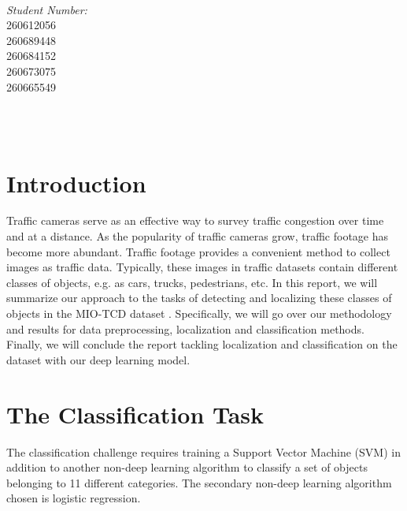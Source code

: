 \documentclass[12pt]{article}
\makeatletter
\let\thedate\@date
\makeatother
\begin{document}
\begin{titlepage}
\begin{minipage}{0.4\textwidth}
\begin{flushleft}
            \end{flushleft}
            \end{minipage}~
            \begin{minipage}{0.4\textwidth}
            \begin{flushright} \large
            \emph{Student Number:} \\
            260612056 \\ 
            260689448 \\ 
            260684152 \\ 
            260673075 \\ 
            260665549  %
        \end{flushright}
    \end{minipage}\\[2 cm]
 
    {\large \thedate}\\[2 cm]
 
    \vfill
    
\end{titlepage}


\section{Introduction}
 Traffic cameras serve as an effective way to survey traffic congestion over time and at a distance. As the popularity of traffic cameras grow, traffic footage has become more abundant. Traffic footage provides a convenient method to collect images as traffic data. Typically, these images in traffic datasets contain different classes of objects, e.g. as cars, trucks, pedestrians, etc. In this report, we will summarize our approach to the tasks of detecting and localizing these classes of objects in the MIO-TCD dataset \cite{MIO_TCD}. Specifically, we will go over our methodology and results for data preprocessing, localization and classification methods. Finally, we will conclude the report tackling localization and classification on the dataset with our deep learning model. 

\section{The Classification Task}

The classification challenge requires training a Support Vector Machine (SVM) in addition to another non-deep learning algorithm to classify a set of objects belonging to 11 different categories. The secondary non-deep learning algorithm chosen is logistic regression.
\end{document}
